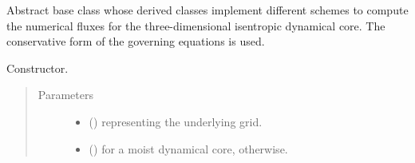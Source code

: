 \documentclass[letterpaper,10pt,english]{sphinxmanual}
\begin{document}
\begin{fulllineitems}
\label{\detokenize{api:tasmania.dycore.flux_isentropic.FluxIsentropic}}
Abstract base class whose derived classes implement different schemes to compute the numerical fluxes for
the three-dimensional isentropic dynamical core. The conservative form of the governing equations is used.

\begin{fulllineitems}
\label{\detokenize{api:tasmania.dycore.flux_isentropic.FluxIsentropic.__init__}}
Constructor.
\begin{quote}\begin{description}
\item[{Parameters}] \leavevmode\begin{itemize}
\item {} 
 () \textendash{} {\hyperref[\detokenize{api:tasmania.grids.grid_xyz.GridXYZ}]{}} representing the underlying grid.

\item {} 
 () \textendash{}  for a moist dynamical core,  otherwise.

\end{itemize}

\end{description}\end{quote}

\end{fulllineitems}



\end{fulllineitems}
\end{document}
